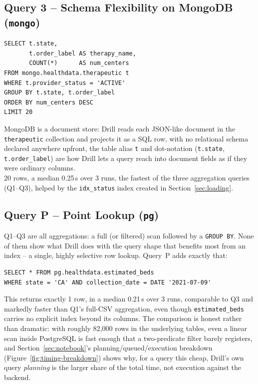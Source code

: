 \documentclass[11pt,a4paper]{article}
\begin{document}
\subsection{Query 3 -- Schema Flexibility on MongoDB (\texttt{mongo})}
\begin{lstlisting}[style=sqlstyle]
SELECT t.state,
       t.order_label AS therapy_name,
       COUNT(*)      AS num_centers
FROM mongo.healthdata.therapeutic t
WHERE t.provider_status = 'ACTIVE'
GROUP BY t.state, t.order_label
ORDER BY num_centers DESC
LIMIT 20
\end{lstlisting}
MongoDB is a document store: Drill reads each JSON-like document in the
\texttt{therapeutic} collection and projects it as a SQL row, with no relational
schema declared anywhere upfront, the table alias \texttt{t} and dot-notation
(\texttt{t.state}, \texttt{t.order\_label}) are how Drill lets a query reach into
document fields as if they were ordinary columns. \\
20 rows, a median 0.25\,s over 3 runs, the fastest of the three aggregation queries
(Q1--Q3), helped by the \texttt{idx\_status} index created in
Section~\ref{sec:loading}.

\subsection{Query P -- Point Lookup (\texttt{pg})}
Q1--Q3 are all aggregations: a full (or filtered) scan followed by a
\texttt{GROUP BY}. None of them show what Drill does with the query shape that
benefits most from an index -- a single, highly selective row lookup. Query~P adds
exactly that:
\begin{lstlisting}[style=sqlstyle]
SELECT * FROM pg.healthdata.estimated_beds
WHERE state = 'CA' AND collection_date = DATE '2021-07-09'
\end{lstlisting}
This returns exactly 1 row, in a median 0.21\,s over 3 runs, comparable to Q3 and
markedly faster than Q1's full-CSV aggregation, even though \texttt{estimated\_beds}
carries no explicit index beyond its columns. The comparison is honest rather than
dramatic: with roughly 82{,}000 rows in the underlying tables, even a linear scan
inside PostgreSQL is fast enough that a two-predicate filter barely registers, and
Section~\ref{sec:notebook}'s planning/queued/execution breakdown
(Figure~\ref{fig:timing-breakdown}) shows why, for a query this cheap, Drill's own
query \emph{planning} is the larger share of the total time, not execution against
the backend.
\end{document}
